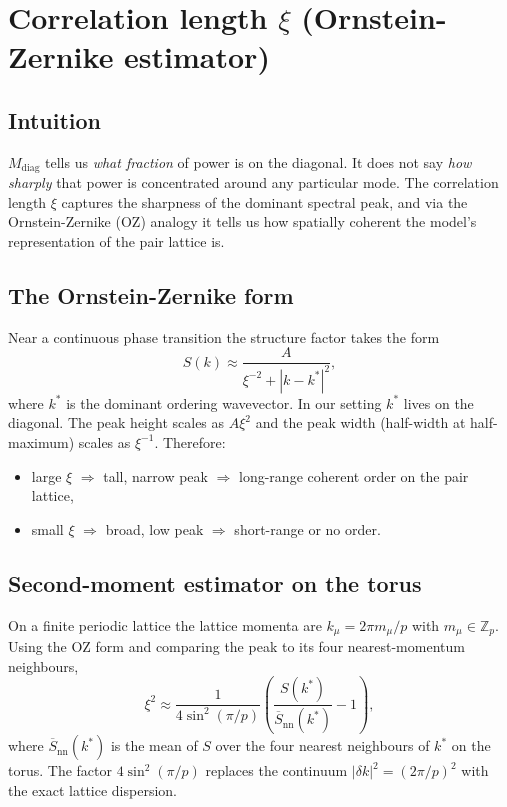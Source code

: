 \documentclass[11pt]{article}
\newcommand{\Zp}{\mathbb{Z}_p}
\newcommand{\diag}{\mathrm{diag}}
\begin{document}
\section{Correlation length $\xi$ (Ornstein-Zernike estimator)}
\label{sec:xi}

\subsection{Intuition}

$M_{\diag}$ tells us \emph{what fraction} of power is on the diagonal.
It does not say \emph{how sharply} that power is concentrated around any
particular mode.
The correlation length $\xi$ captures the sharpness of the dominant spectral
peak, and via the Ornstein-Zernike (OZ) analogy it tells us how spatially
coherent the model's representation of the pair lattice is.

\subsection{The Ornstein-Zernike form}

Near a continuous phase transition the structure factor takes the form
\begin{equation}
    S(k) \approx \frac{A}{\xi^{-2} + |k - k^*|^2},
\end{equation}
where $k^*$ is the dominant ordering wavevector.
In our setting $k^*$ lives on the diagonal.
The peak height scales as $A\xi^2$ and the peak width (half-width at
half-maximum) scales as $\xi^{-1}$.
Therefore:
\begin{itemize}
    \item large $\xi$ $\Rightarrow$ tall, narrow peak $\Rightarrow$
    long-range coherent order on the pair lattice,
    \item small $\xi$ $\Rightarrow$ broad, low peak $\Rightarrow$
    short-range or no order.
\end{itemize}

\subsection{Second-moment estimator on the torus}

On a finite periodic lattice the lattice momenta are
$k_\mu = 2\pi m_\mu / p$ with $m_\mu\in\Zp$.
Using the OZ form and comparing the peak to its four nearest-momentum
neighbours,
\begin{equation}
    \xi^2 \approx
    \frac{1}{4\sin^2(\pi/p)}
    \left(\frac{S(k^*)}{\overline{S}_{\mathrm{nn}}(k^*)} - 1\right),
    \label{eq:xi}
\end{equation}
where $\overline{S}_{\mathrm{nn}}(k^*)$ is the mean of $S$ over the four
nearest neighbours of $k^*$ on the torus.
The factor $4\sin^2(\pi/p)$ replaces the continuum $|\delta k|^2 = (2\pi/p)^2$
with the exact lattice dispersion.
\end{document}
